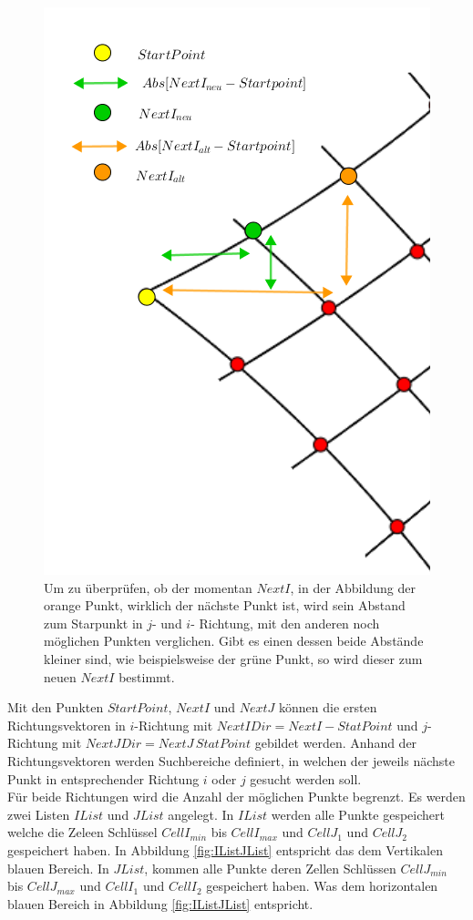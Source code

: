 \begin{figure}[!htb]
	\centering
	\includegraphics[width=0.5\linewidth]{images/SearchNextI.png}
	\caption[Überprüfung des gefundenen $NextI$]{Um zu überprüfen, ob der momentan $NextI$, in der Abbildung der orange Punkt, wirklich der nächste Punkt ist, wird sein Abstand zum Starpunkt in $j$- und  $i$- Richtung, mit den anderen noch möglichen Punkten verglichen. Gibt es einen dessen beide Abstände kleiner sind, wie beispielsweise der grüne Punkt, so wird dieser zum neuen $NextI$ bestimmt.}
	\label{fig:FindNextIJ}
\end{figure}


Mit den Punkten $StartPoint$, $NextI$ und $NextJ$ können die ersten Richtungsvektoren in $i$-Richtung mit $NextIDir= NextI - StatPoint$ und $j$- Richtung mit $NextJDir =NextJ\,StatPoint$ gebildet werden. Anhand der Richtungsvektoren werden Suchbereiche definiert, in welchen der jeweils nächste Punkt in entsprechender Richtung $i$ oder $j$ gesucht werden soll.\\ 


Für beide Richtungen wird die Anzahl der möglichen Punkte begrenzt. Es werden zwei Listen $IList$ und $JList$ angelegt. In $IList$ werden alle Punkte gespeichert welche die Zeleen Schlüssel $CellI_{min}$ bis $CellI_{max}$ und $CellJ_1$ und $CellJ_2$ gespeichert haben. In Abbildung \ref{fig:IListJList} entspricht das dem Vertikalen blauen Bereich. In $JList$, kommen alle Punkte deren Zellen Schlüssen $CellJ_{min}$ bis $CellJ_{max}$ und $CellI_1$ und $CellI_2$ gespeichert haben. Was dem horizontalen blauen Bereich in Abbildung \ref{fig:IListJList} entspricht. \\

